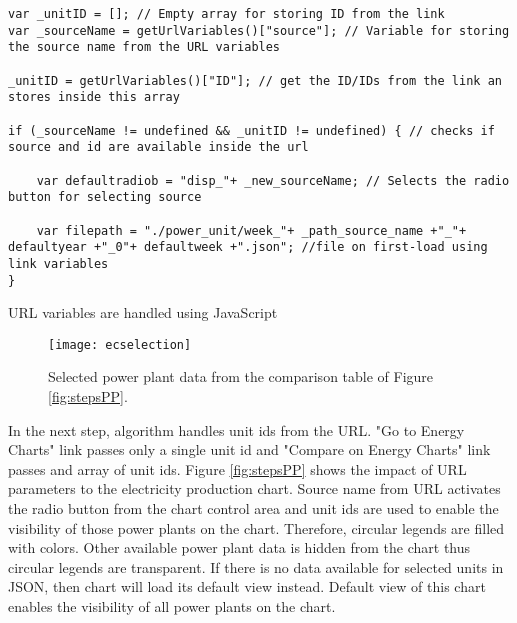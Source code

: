 \begin{Listing}
\begin{lstlisting}
var _unitID = []; // Empty array for storing ID from the link 
var _sourceName = getUrlVariables()["source"]; // Variable for storing the source name from the URL variables

_unitID = getUrlVariables()["ID"]; // get the ID/IDs from the link an stores inside this array

if (_sourceName != undefined && _unitID != undefined) { // checks if source and id are available inside the url

	var defaultradiob = "disp_"+ _new_sourceName; // Selects the radio button for selecting source

	var filepath = "./power_unit/week_"+ _path_source_name +"_"+ defaultyear +"_0"+ defaultweek +".json"; //file on first-load using link variables
}

\end{lstlisting}
\caption{URL variables are handled using JavaScript}
\label{lst:url-json}
\end{Listing}

\begin{figure}
\centering
\texttt{[image: ecselection]}
\caption{Selected power plant data from the comparison table of Figure \ref{fig:stepsPP}.}
\label{fig:ecselect}
\end{figure}

In the next step, algorithm handles unit ids from the URL. "Go to Energy Charts" link passes only a single unit id and "Compare on Energy Charts" link passes and array of unit ids. Figure \ref{fig:stepsPP} shows the impact of URL parameters to the electricity production chart. Source name from URL activates the radio button from the chart control area and unit ids are used to enable the visibility of those power plants on the chart. Therefore, circular legends are filled with colors. Other available power plant data is hidden from the chart thus circular legends are transparent. If there is no data available for selected units in JSON, then chart will load its default view instead. Default view of this chart enables the visibility of all power plants on the chart. 

%
%
%	
%	
%	
%

